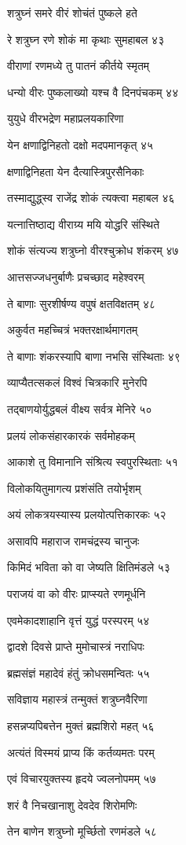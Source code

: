 शत्रुघ्नं समरे वीरं शोचंतं पुष्कले हते

रे शत्रुघ्न रणे शोकं मा कृथाः सुमहाबल ४३

वीराणां रणमध्ये तु पातनं कीर्तये स्मृतम्

धन्यो वीरः पुष्कलाख्यो यश्च वै दिनपंचकम् ४४

युयुधे वीरभद्रेण महाप्रलयकारिणा

येन क्षणाद्विनिहतो दक्षो मदपमानकृत् ४५

क्षणाद्विनिहता येन दैत्यास्त्रिपुरसैनिकाः

तस्माद्युद्ध्स्व राजेंद्र शोकं त्यक्त्वा महाबल ४६

यत्नात्तिष्ठाद्य वीराग्र्य मयि योद्धरि संस्थिते

शोकं संत्यज्य शत्रुघ्नो वीरश्चुक्रोध शंकरम् ४७

आत्तसज्जधनुर्बाणैः प्रचच्छाद महेश्वरम्

ते बाणाः सुरशीर्षण्य वपुषं क्षतविक्षतम् ४८

अकुर्वत महच्चित्रं भक्तरक्षार्थमागतम्

ते बाणाः शंकरस्यापि बाणा नभसि संस्थिताः ४९

व्याप्यैतत्सकलं विश्वं चित्रकारि मुनेरपि

तद्बाणयोर्युद्धबलं वीक्ष्य सर्वत्र मेनिरे ५०

प्रलयं लोकसंहारकारकं सर्वमोहकम्

आकाशे तु विमानानि संश्रित्य स्वपुरस्थिताः ५१

विलोकयितुमागत्य प्रशंसंति तयोर्भृशम्

अयं लोकत्रयस्यास्य प्रलयोत्पत्तिकारकः ५२

असावपि महाराज रामचंद्रस्य चानुजः

किमिदं भविता को वा जेष्यति क्षितिमंडले ५३

पराजयं वा को वीरः प्राप्स्यते रणमूर्धनि

एवमेकादशाहानि वृत्तं युद्धं परस्परम् ५४

द्वादशे दिवसे प्राप्ते मुमोचास्त्रं नराधिपः

ब्रह्मसंज्ञं महादेवं हंतुं क्रोधसमन्वितः ५५

सविज्ञाय महास्त्रं तन्मुक्तं शत्रुघ्नवैरिणा

हसन्नप्यपिबत्तेन मुक्तं ब्रह्मशिरो महत् ५६

अत्यंतं विस्मयं प्राप्य किं कर्तव्यमतः परम्

एवं विचारयुक्तस्य हृदये ज्वलनोपमम् ५७

शरं वै निचखानाशु देवदेव शिरोमणिः

तेन बाणेन शत्रुघ्नो मूर्च्छितो रणमंडले ५८

